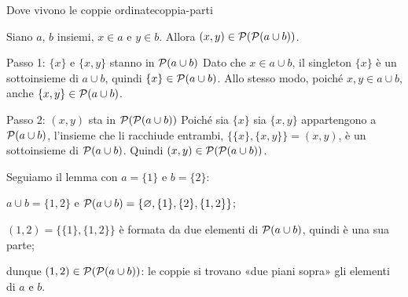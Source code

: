 \begin{concetto}
\begin{Lemma}{Dove vivono le coppie ordinate}{coppia-parti}
    \begin{prerequisiti}
    \end{prerequisiti}
    Siano $a$, $b$ insiemi, $x \in a$ e $y \in b$. Allora $(x, y) \in \mathcal{P}(\mathcal{P}(a \cup b))$.
\end{Lemma}
\begin{dimostrazione}
    \begin{caso}{Passo 1: $\{x\}$ e $\{x, y\}$ stanno in $\mathcal{P}(a \cup b)$}
        Dato che $x \in a \cup b$, il singleton $\{x\}$ è un sottoinsieme di $a \cup b$, quindi $\{x\} \in \mathcal{P}(a \cup b)$.
        Allo stesso modo, poiché $x, y \in a \cup b$, anche $\{x, y\} \in \mathcal{P}(a \cup b)$.
    \end{caso}
    \begin{caso}{Passo 2: $(x, y)$ sta in $\mathcal{P}(\mathcal{P}(a \cup b))$}
        Poiché sia $\{x\}$ sia $\{x, y\}$ appartengono a $\mathcal{P}(a \cup b)$, l'insieme che li racchiude entrambi,
        $\{\{x\}, \{x, y\}\} = (x, y)$, è un sottoinsieme di $\mathcal{P}(a \cup b)$. Quindi $(x, y) \in \mathcal{P}(\mathcal{P}(a \cup b))$.
    \end{caso}
\end{dimostrazione}
\end{concetto}

\begin{spiegazione}
    Seguiamo il lemma con $a = \{1\}$ e $b = \{2\}$:
    \begin{passi}
        \item $a \cup b = \{1, 2\}$ e $\mathcal{P}(a \cup b) = \{\varnothing, \{1\}, \{2\}, \{1, 2\}\}$;
        \item $(1, 2) = \{\{1\}, \{1, 2\}\}$ è formata da due elementi di $\mathcal{P}(a \cup b)$, quindi è una sua parte;
        \item dunque $(1, 2) \in \mathcal{P}(\mathcal{P}(a \cup b))$: le coppie si trovano «due piani sopra» gli elementi di $a$ e $b$.
    \end{passi}
\end{spiegazione}



